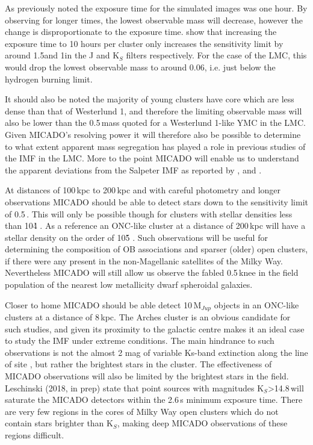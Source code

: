 As previously noted the exposure time for the simulated images was one hour. By observing for longer times, the lowest observable mass will decrease, however the change is disproportionate to the exposure time. \citet{leschinski2016} show that increasing the exposure time to 10 hours per cluster only increases the sensitivity limit by around 1.5\m and 1\m in the J and K$_S$ filters respectively. For the case of the LMC, this would drop the lowest observable mass to around 0.06\msune, i.e. just below the hydrogen burning limit.

It should also be noted the majority of young clusters have core which are less dense than that of Westerlund 1, and therefore the limiting observable mass will also be lower than the 0.5\,\msun mass quoted for a Westerlund 1-like YMC in the LMC. Given MICADO's resolving power it will therefore also be possible to determine to what extent apparent mass segregation has played a role in previous studies of the IMF in the LMC. More to the point MICADO will enable us to understand the apparent deviations from the Salpeter IMF as reported by \citet{dario2009}, \citet{geha2013} and \citet{kalirai2013}.

At distances of 100\,kpc to 200\,kpc and with careful photometry and longer observations MICADO should be able to detect stars down to the sensitivity limit of 0.5\,\msun. This will only be possible though for clusters with stellar densities less than 10\h4 \spa. As a reference an ONC-like cluster at a distance of 200\,kpc will have a stellar density on the order of 10\h5 \spa. Such observations will be useful for determining the composition of OB associations and sparser (older) open clusters, if there were any present in the non-Magellanic satellites of the Milky Way. Nevertheless MICADO will still allow us observe the fabled 0.5\,\msun knee in the field population of the nearest low metallicity dwarf spheroidal galaxies.

Closer to home MICADO should be able detect 10\,M$_{Jup}$ objects in an ONC-like clusters at a distance of 8\,kpc. The Arches cluster is an obvious candidate for such studies, and given its proximity to the galactic centre makes it an ideal case to study the IMF under extreme conditions. The main hindrance to such observations is not the almost 2 mag of variable Ks-band extinction  along the line of site \citep{espinoza2009}, but rather the brightest stars in the cluster. The effectiveness of MICADO observations will also be limited by the brightest stars in the field. Leschinski (2018, in prep) state that point sources with magnitudes K$_S$\textgreater14.8\,\m will saturate the MICADO detectors within the 2.6\,s minimum exposure time. There are very few regions in the cores of Milky Way open clusters which do not contain stars brighter than K$_S$\m, making deep MICADO observations of these regions difficult.


